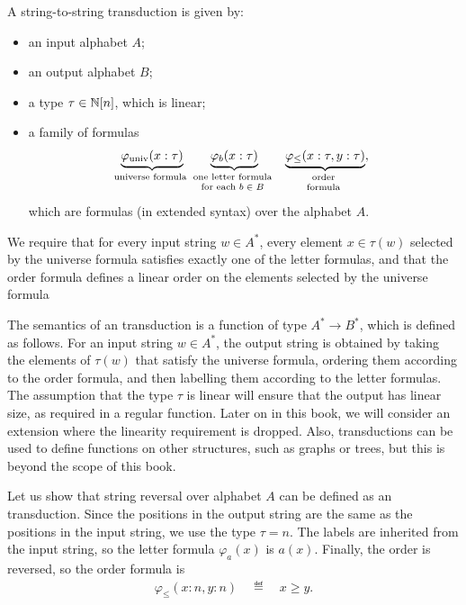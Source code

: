 \begin{definition}\label{def:mso-transduction}
    A string-to-string \mso transduction is given by: 
\begin{itemize}
    \item an input alphabet $A$;
    \item an output alphabet $B$;
    \item a  type $\tau \in {\mathbb N}[n]$, which is linear;
    \item a family of  formulas 
    \begin{align*}
        \myunderbrace{\varphi_{\text{univ}}(x : \tau)}{universe formula}
        \qquad
        \myunderbrace{\varphi_b(x : \tau)}{one letter formula   \\  for each $b \in B$} 
        \qquad 
        \myunderbrace{\varphi_{\leq}(x : \tau, y : \tau)}{order \\ formula},
    \end{align*}
    which are \mso formulas (in extended syntax) over the alphabet $A$.
\end{itemize}
We require that for every input string $w \in A^*$, every element $x \in \tau(w)$ selected by the universe formula satisfies exactly one of the letter formulas, and that the order formula defines a linear order on the  elements selected by the universe formula
\end{definition}

The semantics of an \mso transduction is a function of type $A^* \to B^*$, which is defined as follows. For an input string $w \in A^*$, the output string is obtained by taking the elements of $\tau(w)$ that satisfy the universe formula, ordering them according to the order formula, and then labelling them according to the letter formulas. The assumption that the type $\tau$ is linear will ensure that the output has linear size, as required in a regular function. Later on in this book, we will consider an extension where the linearity requirement is dropped. Also, \mso transductions can be used to define functions on other structures, such as graphs or trees, but this is beyond the scope of this book.

\begin{myexample}
   Let us show that string reversal over alphabet $ A$ can be defined as an \mso transduction. Since the positions in the output string are the same as the positions in the input string, we use the type $\tau = n$. The labels are inherited from the input string, so the letter formula $\varphi_a(x)$ is $a(x)$. Finally, the order is reversed, so the order formula is 
   \begin{align*}
   \varphi_{\leq}(x : n ,y : n) \quad \eqdef \quad x \geq y.
   \end{align*}
\end{myexample}

